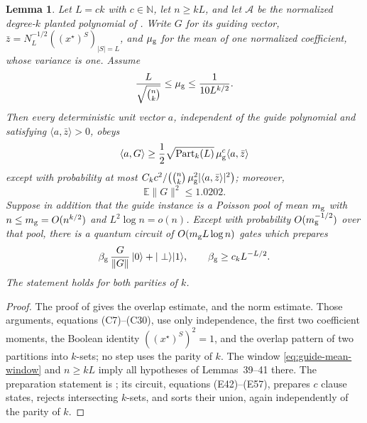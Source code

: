 \documentclass[11pt]{article}
\newtheorem{lemma}[lemma]{Lemma}
\theoremstyle{definition}
\theoremstyle{remark}
\newcommand{\1}{\mathbf 1}
\numberwithin{equation}{section}
\begin{document}
\begin{lemma}\label{lem:parity-free-guide}
Let $L=ck$ with $c\in\mathbb N$, let $n\ge kL$, and let $\mathcal A$ be the
normalized degree-$k$ planted polynomial of
\cite[Definition~36 and equation~(C6)]{SOKB}.  Write $G$ for its guiding
vector, $\bar z=N_L^{-1/2}((x^\star)^S)_{|S|=L}$, and $\mu_{\rm g}$ for
the mean of one normalized coefficient, whose variance is one.  Assume
\begin{equation}\label{eq:guide-mean-window}
 \frac{L}{\sqrt{\binom nk}}\le\mu_{\rm g}\le\frac1{10L^{k/2}}.
\end{equation}
Then every deterministic unit vector $a$, independent of the guide
polynomial and satisfying $\langle a,\bar z\rangle>0$, obeys
\begin{equation}\label{eq:raw-guide-overlap}
 \langle a,G\rangle
 \ge \frac12\sqrt{\operatorname{Part}_k(L)}\,\mu_{\rm g}^c
       \langle a,\bar z\rangle
\end{equation}
except with probability at most
$C_kc^2/\bigl(\binom nk\,\mu_{\rm g}^2|\langle a,\bar z\rangle|^2\bigr)$;
moreover,
\begin{equation}\label{eq:guide-norm-mean}
 \mathbb E\|G\|^2\le1.0202.
\end{equation}
Suppose in addition that the guide instance is a Poisson pool of mean
$m_{\rm g}$ with
$n\le m_{\rm g}=O(n^{k/2})$ and $L^2\log n=o(n)$.
Except with probability $O(m_{\rm g}^{-1/2})$ over that pool, there is a
quantum circuit of $O(m_{\rm g}L\log n)$ gates which prepares
\begin{equation}\label{eq:raw-guide-preparation}
 \beta_{\rm g}\,\frac{G}{\|G\|}\,|0\rangle+|\perp\rangle|1\rangle,
 \qquad
 \beta_{\rm g}\ge c_kL^{-L/2}.
\end{equation}
The statement holds for both parities of $k$.
\end{lemma}
\begin{proof}
The proof of \cite[Theorem~38]{SOKB} gives the overlap estimate, and
\cite[Lemmas~40 and 41]{SOKB} the norm estimate.  Those arguments,
equations (C7)--(C30), use only independence, the first two coefficient
moments, the Boolean identity $((x^\star)^S)^2=1$, and the overlap
pattern of two partitions into $k$-sets; no step uses the parity of
$k$.  The window \cref{eq:guide-mean-window} and $n\ge kL$ imply all
hypotheses of Lemmas~39--41 there.  The preparation statement is
\cite[Theorem~69]{SOKB}; its circuit, equations (E42)--(E57), prepares
$c$ clause states, rejects intersecting $k$-sets, and sorts their
union, again independently of the parity of $k$.
\end{proof}
\end{document}
